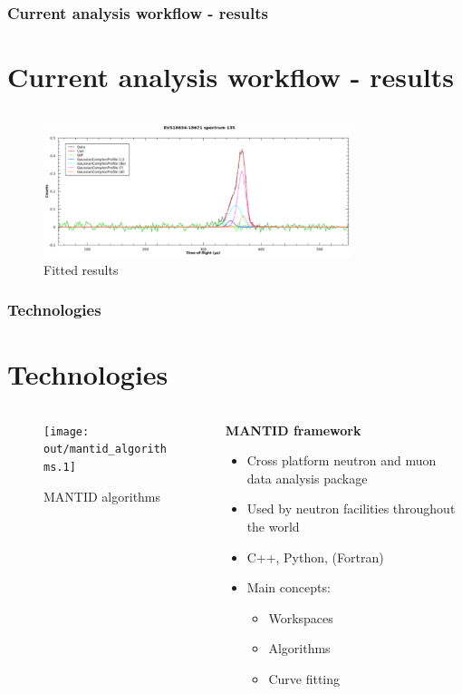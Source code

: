 \documentclass[10pt,serif,t]{beamer}
\newcommand\Heading[1]{%
  {\bfseries#1}\par\smallskip}
\newenvironment{Slide}[1]
{
\begin{frame}[fragile,environment=Slide]
  \frametitle{#1}
  \section{#1}
}
{
\end{frame}
}
\begin{document}
\begin{Slide}{Current analysis workflow - results}
  \inputminted[frame=lines,fontsize=\tiny]{python}{listings/tof_fit_extracts.py}
  \begin{figure}[h!]
    \centering
    \includegraphics[width=0.8\textwidth]{graphics/current_workflow_fitting.eps}
    \caption{Fitted results \cite{ral_tr_2015_007}}
    \label{fig:current_workflow_fitting}
  \end{figure}
\end{Slide}

\begin{Slide}{Technologies}
  \begin{columns}[T]
    \begin{column}{.55\textwidth}
      \begin{figure}[h!]
        \centering
        \texttt{[image: out/mantid\_algorithms.1]}
        \caption{MANTID algorithms}
        \label{fig:mantid_algorithms}
      \end{figure}
    \end{column}
    \hfill
    \begin{column}{.44\textwidth}
      \Heading{MANTID framework}
      \begin{itemize}
        \item Cross platform neutron and muon data analysis package
        \item Used by neutron facilities throughout the world
        \item C++, Python, (Fortran)
        \item Main concepts:
          \begin{itemize}
            \item Workspaces
            \item Algorithms
            \item Curve fitting
          \end{itemize}
      \end{itemize}
    \end{column}
  \end{columns}
\end{Slide}
\end{document}
